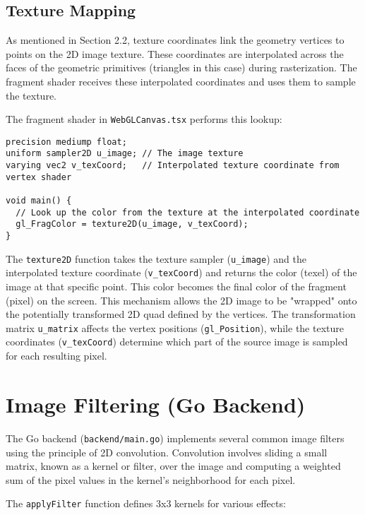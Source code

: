 \documentclass{article}
\begin{document}
\subsection{Texture Mapping}
As mentioned in Section 2.2, texture coordinates link the geometry vertices to points on the 2D image texture. These coordinates are interpolated across the faces of the geometric primitives (triangles in this case) during rasterization. The fragment shader receives these interpolated coordinates and uses them to sample the texture.

The fragment shader in \texttt{WebGLCanvas.tsx} performs this lookup:
\begin{verbatim}
precision mediump float;
uniform sampler2D u_image; // The image texture
varying vec2 v_texCoord;   // Interpolated texture coordinate from vertex shader

void main() {
  // Look up the color from the texture at the interpolated coordinate
  gl_FragColor = texture2D(u_image, v_texCoord);
}
\end{verbatim}
The \texttt{texture2D} function takes the texture sampler (\texttt{u\_image}) and the interpolated texture coordinate (\texttt{v\_texCoord}) and returns the color (texel) of the image at that specific point. This color becomes the final color of the fragment (pixel) on the screen. This mechanism allows the 2D image to be "wrapped" onto the potentially transformed 2D quad defined by the vertices. The transformation matrix \texttt{u\_matrix} affects the vertex positions (\texttt{gl\_Position}), while the texture coordinates (\texttt{v\_texCoord}) determine which part of the source image is sampled for each resulting pixel.

\section{Image Filtering (Go Backend)}

The Go backend (\texttt{backend/main.go}) implements several common image filters using the principle of 2D convolution. Convolution involves sliding a small matrix, known as a kernel or filter, over the image and computing a weighted sum of the pixel values in the kernel's neighborhood for each pixel.

The \texttt{applyFilter} function defines 3x3 kernels for various effects:
\end{document}
